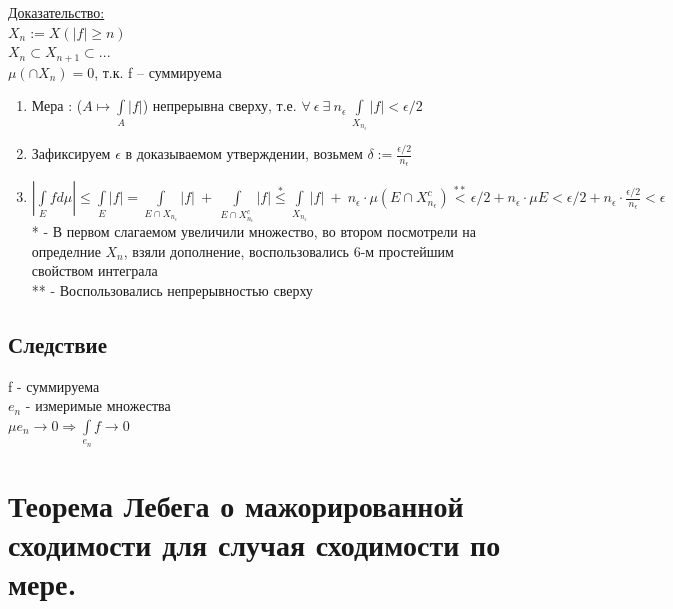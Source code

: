 \documentclass[paper=a4, fontsize=17pt]{article}
\begin{document}
\underline{Доказательство:} \\
$X_n := X(|f| \geq n)$\\
$X_n \subset X_{n+1} \subset ...$\\
$\mu(\cap X_n) = 0$, т.к. f -- суммируема
\begin{enumerate}
	\item Мера : ($A \mapsto \int\limits_{A}|f|$) непрерывна сверху, т.е.
	$\forall ~ \epsilon ~ \exists ~ n_{\epsilon} ~ \int\limits_{X_{n_{\epsilon}}}|f| < \epsilon / 2$
	\item Зафиксируем $\epsilon$ в доказываемом утверждении, возьмем $\delta := \frac{\epsilon / 2}{n_{\epsilon}}$
	\item $|\int\limits_{E}f d\mu| \leq \int\limits_{E} |f| = \int\limits_{E \cap X_{n_{\epsilon}}}|f| ~+~ \int\limits_{E \cap X_{n_{\epsilon}}^c}|f| \overset{*}{\leq} \int\limits_{X_{n_{\epsilon}}}|f| ~+~ n_{\epsilon} \cdot \mu (E \cap X_{n_{\epsilon}}^c) \overset{**}{<} \epsilon / 2 + n_\epsilon \cdot \mu E < \epsilon / 2 + n_\epsilon \cdot \frac{\epsilon / 2}{n_{\epsilon}} < \epsilon$ \\
	* - В первом слагаемом увеличили множество, во втором посмотрели на определние $X_n$, взяли дополнение, воспользовались 6-м простейшим свойством интеграла\\
	** - Воспользовались непрерывностью сверху
\end{enumerate}
	\subsection{Следствие}
	f - суммируема\\
	$e_n$ - измеримые множества\\

	$\mu e_n \rightarrow 0 \Rightarrow \int\limits_{e_n}f \rightarrow 0$
\section{Теорема Лебега о мажорированной сходимости для случая сходимости по мере.}
\end{document}
